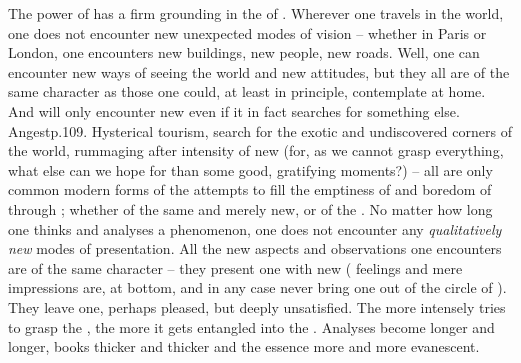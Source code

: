\pa The power of  has a firm grounding in the
 of . Wherever one travels in the world, one does
not encounter new unexpected modes of vision -- whether in Paris or London, one
encounters new buildings, new people, new roads. Well, one can encounter new
ways of seeing the world and new attitudes, but they all are of the same
character as those one could, at least in principle, contemplate at home. And
 will only encounter new  even if it in fact searches
for something else. \citet{Life is, however, rich enough when one only can see;
  one need not travel to Paris and London -- and that does not help, when one
  can not see.}{Angest}{p.109.   Hysterical
  tourism, search for the exotic and undiscovered corners of the world,
  rummaging after intensity of new  (for, as we cannot grasp
  everything, what else can we hope for than some good, gratifying moments?) --
  all are only common modern forms of the attempts to fill the emptiness of
   and boredom of  through ; whether
   of the same and merely new, or  of the .}  No matter how long one thinks and  analyses a
phenomenon, one does not encounter any {\em qualitatively new} modes of
presentation. All the new aspects and observations one encounters are of the
same character -- they present one with new  (
feelings and mere  impressions are, at bottom, 
and in any case never bring one out of the circle of ). They leave one, perhaps pleased, but deeply unsatisfied. The more
intensely  tries to grasp the , the more it gets
entangled into the . Analyses become longer and
longer, books thicker and thicker and the essence more and more evanescent.



